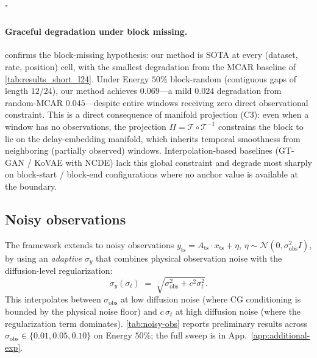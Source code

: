 "\documentclass{article}
\theoremstyle{plain}
\theoremstyle{definition}
\theoremstyle{remark}
\newcommand{\tsimg}{\mathcal{T}}
\newcommand{\imgts}{\mathcal{T}^{-1}}
\newcommand{\Ats}{A_{\mathrm{ts}}}
\newcommand{\yts}{y_{\mathrm{ts}}}
\newcommand{\xts}{x_{\mathrm{ts}}}
\begin{document}
\paragraph{Graceful degradation under block missing.}
 confirms the block-missing hypothesis: our method is SOTA at every (dataset, rate, position) cell, with the smallest degradation from the MCAR baseline of \cref{tab:results_short_l24}. Under Energy $50\%$ block-random (contiguous gaps of length $12/24$), our method achieves $0.069$---a mild $0.024$ degradation from random-MCAR $0.045$---despite entire windows receiving zero direct observational constraint. This is a direct consequence of manifold projection (C3): even when a window has no observations, the projection $\Pi = \tsimg \circ \imgts$ constrains the block to lie on the delay-embedding manifold, which inherits temporal smoothness from neighboring (partially observed) windows. Interpolation-based baselines (GT-GAN / KoVAE with NCDE) lack this global constraint and degrade most sharply on block-start / block-end configurations where no anchor value is available at the boundary.

\vspace{-1mm}
\subsection{Noisy observations}
\label{sec:noisy}
\vspace{-1mm}

The framework extends to noisy observations $\yts = \Ats \cdot \xts + \eta$, $\eta \sim \mathcal{N}(0, \sigma_{\mathrm{obs}}^2 I)$, by using an \emph{adaptive} $\sigma_y$ that combines physical observation noise with the diffusion-level regularization:
\begin{equation}
\sigma_y(\sigma_t) \;=\; \sqrt{\sigma_{\mathrm{obs}}^2 + c^2 \sigma_t^2}.
\label{eq:adaptive-sy}
\end{equation}
This interpolates between $\sigma_{\mathrm{obs}}$ at low diffusion noise (where CG conditioning is bounded by the physical noise floor) and $c\,\sigma_t$ at high diffusion noise (where the regularization term dominates). \cref{tab:noisy-obs} reports preliminary results across $\sigma_{\mathrm{obs}} \in \{0.01, 0.05, 0.10\}$ on Energy $50\%$; the full sweep is in App.~\ref{app:additional-exp}.

\begin{table}[h]
\centering
\caption{Adaptive $\sigma_y$ under noisy observations (Energy $50\%$, varying $\sigma_{\mathrm{obs}}$). \texttt{TODO} cells await the noisy-observation experiment.}
\label{tab:noisy-obs}
\vspace{-1mm}
\end{table}
\end{document}
